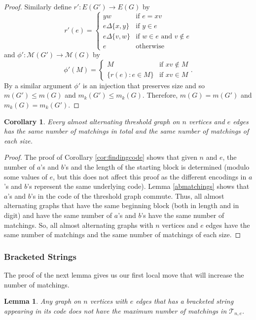 \documentclass[12pt]{amsart}
\theoremstyle{plain}
\newtheorem{lem}[thm]{Lemma}
\newtheorem{cor}[thm]{Corollary}
\theoremstyle{definition}
\newcommand{\cT}{\mathcal{T}}
\newcommand{\cM}{\mathcal{M}}
\begin{document}
\begin{proof}
Similarly define $r': E(G')\to E(G)$ by
$$r'(e) = 
\begin{cases}
yw &\text{if $e=xv$}\\
e\Delta\{x,y\} &\text{if $y\in e$}\\
e\Delta\{v,w\} &\text{if $w\in e$ and $v\notin e$}\\
e &\text{otherwise}
\end{cases}$$
and $\phi': \cM(G')\to \cM(G)$ by
$$\phi'(M)=
\begin{cases}
M &\text{if $xv\notin M$}\\
\{r(e): e\in M\} &\text{if $xv\in M$}
\end{cases}.$$
By a similar argument $\phi'$ is an injection that preserves size and so $m(G')\leq m(G)$ and $m_k(G')\leq m_k(G)$.  Therefore, $m(G) = m(G')$ and $m_k(G) = m_k(G')$.
\end{proof}


\begin{cor}
\label{cor:SameNumber}
Every almost alternating threshold graph on $n$ vertices and $e$ edges has the same number of matchings in total and the same number of matchings of each size. 
\end{cor}
\begin{proof}
The proof of Corollary \ref{cor:findingcode} shows that given $n$ and $e$, the number of $a$'s and $b$'s and the length of the starting block is determined (modulo some values of $e$, but this does not affect this proof as the different encodings in $a$'s and $b$'s represent the same underlying code). Lemma \ref{abmatchings}   shows that $a$'s and $b$'s in the code of the threshold graph commute.  Thus, all almost alternating graphs that have the same beginning block (both in length and in digit) and have the same number of $a$'s and $b$'s have the same number of matchings.  So, all almost alternating graphs with $n$ vertices and $e$ edges have the same number of matchings and the same number of matchings of each size. 
\end{proof}



\subsubsection{Bracketed Strings}
The proof of the next lemma gives us our first local move that will  increase the number of matchings. %



\begin{lem} 
\label{bracketedstring}  Any graph on $n$ vertices with $e$ edges that has a bracketed string appearing in its code does not have the maximum number of matchings in $\cT_{n,e}$.  
\end{lem}
\end{document}
